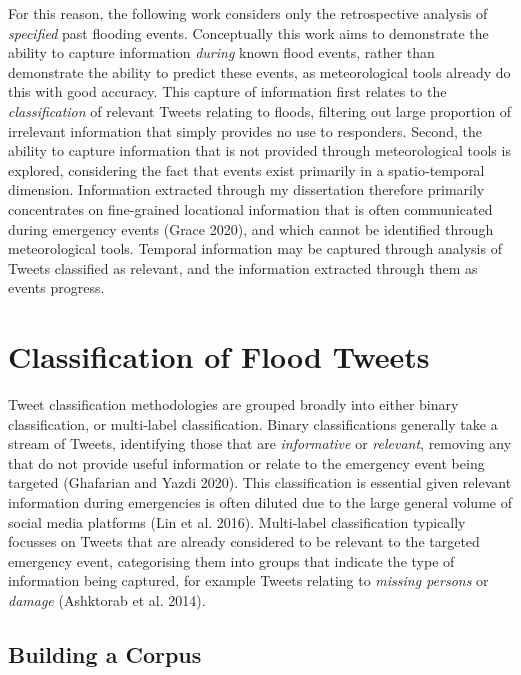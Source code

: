\documentclass[a4paper, notitlepage]{extreport}
\begin{document}
For this reason, the following work considers only the retrospective
analysis of \emph{specified} past flooding events. Conceptually this
work aims to demonstrate the ability to capture information
\emph{during} known flood events, rather than demonstrate the ability to
predict these events, as meteorological tools already do this with good
accuracy. This capture of information first relates to the
\emph{classification} of relevant Tweets relating to floods, filtering
out large proportion of irrelevant information that simply provides no
use to responders. Second, the ability to capture information that is
not provided through meteorological tools is explored, considering the
fact that events exist primarily in a spatio-temporal dimension.
Information extracted through my dissertation therefore primarily
concentrates on fine-grained locational information that is often
communicated during emergency events (Grace 2020), and which cannot be
identified through meteorological tools. Temporal information may be
captured through analysis of Tweets classified as relevant, and the
information extracted through them as events progress.

\hypertarget{classification-of-flood-tweets}{%
\section{Classification of Flood
Tweets}\label{classification-of-flood-tweets}}

Tweet classification methodologies are grouped broadly into either
binary classification, or multi-label classification. Binary
classifications generally take a stream of Tweets, identifying those
that are \emph{informative} or \emph{relevant}, removing any that do not
provide useful information or relate to the emergency event being
targeted (Ghafarian and Yazdi 2020). This classification is essential
given relevant information during emergencies is often diluted due to
the large general volume of social media platforms (Lin et al. 2016).
Multi-label classification typically focusses on Tweets that are already
considered to be relevant to the targeted emergency event, categorising
them into groups that indicate the type of information being captured,
for example Tweets relating to \emph{missing persons} or \emph{damage}
(Ashktorab et al. 2014).

\hypertarget{building-a-corpus}{%
\subsection{Building a Corpus}\label{building-a-corpus}}
\end{document}

